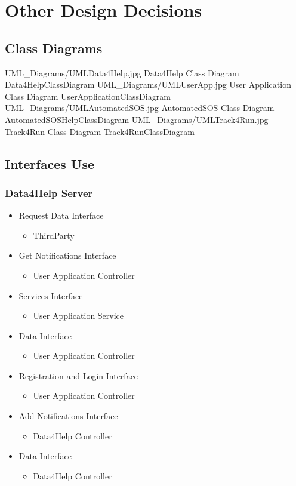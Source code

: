 \documentclass[../../DD.tex]{subfiles}
\begin{document}
\section{Other Design Decisions}
	\subsection{Class Diagrams}
	\image {13cm} {UML_Diagrams/UMLData4Help.jpg} {Data4Help Class Diagram} {Data4HelpClassDiagram}
	\image {13cm} {UML_Diagrams/UMLUserApp.jpg} {User Application Class Diagram} {UserApplicationClassDiagram}
	\image {13cm} {UML_Diagrams/UMLAutomatedSOS.jpg} {AutomatedSOS Class Diagram} {AutomatedSOSHelpClassDiagram}
	\image {13cm} {UML_Diagrams/UMLTrack4Run.jpg} {Track4Run Class Diagram} {Track4RunClassDiagram}

	\subsection{Interfaces Use}

		\subsubsection{Data4Help Server}
		\begin{itemize}
			\item Request Data Interface
			\begin{itemize}
				\item ThirdParty
			\end{itemize}
			\item Get Notifications Interface
			\begin{itemize}
				\item User Application Controller
			\end{itemize}
			\item Services Interface
			\begin{itemize}
				\item User Application Service
			\end{itemize}
			\item Data Interface
			\begin{itemize}
				\item User Application Controller
			\end{itemize}
			\item Registration and Login Interface
			\begin{itemize}
				\item User Application Controller
			\end{itemize}
			\item Add Notifications Interface
			\begin{itemize}
				\item Data4Help Controller
			\end{itemize}
			\item Data Interface
			\begin{itemize}
				\item Data4Help Controller
			\end{itemize}
		\end{itemize}
\end{document}
